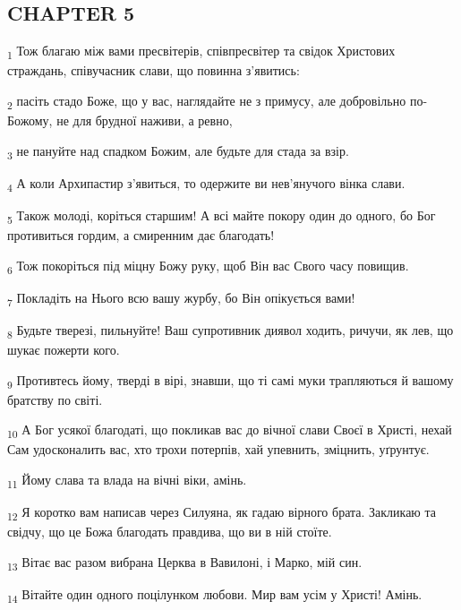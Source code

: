 \subsection{CHAPTER 5}
\begin{tcolorbox}
\textsubscript{1} Тож благаю між вами пресвітерів, співпресвітер та свідок Христових страждань, співучасник слави, що повинна з'явитись:
\end{tcolorbox}
\begin{tcolorbox}
\textsubscript{2} пасіть стадо Боже, що у вас, наглядайте не з примусу, але добровільно по-Божому, не для брудної наживи, а ревно,
\end{tcolorbox}
\begin{tcolorbox}
\textsubscript{3} не пануйте над спадком Божим, але будьте для стада за взір.
\end{tcolorbox}
\begin{tcolorbox}
\textsubscript{4} А коли Архипастир з'явиться, то одержите ви нев'янучого вінка слави.
\end{tcolorbox}
\begin{tcolorbox}
\textsubscript{5} Також молоді, коріться старшим! А всі майте покору один до одного, бо Бог противиться гордим, а смиренним дає благодать!
\end{tcolorbox}
\begin{tcolorbox}
\textsubscript{6} Тож покоріться під міцну Божу руку, щоб Він вас Свого часу повищив.
\end{tcolorbox}
\begin{tcolorbox}
\textsubscript{7} Покладіть на Нього всю вашу журбу, бо Він опікується вами!
\end{tcolorbox}
\begin{tcolorbox}
\textsubscript{8} Будьте тверезі, пильнуйте! Ваш супротивник диявол ходить, ричучи, як лев, що шукає пожерти кого.
\end{tcolorbox}
\begin{tcolorbox}
\textsubscript{9} Противтесь йому, тверді в вірі, знавши, що ті самі муки трапляються й вашому братству по світі.
\end{tcolorbox}
\begin{tcolorbox}
\textsubscript{10} А Бог усякої благодаті, що покликав вас до вічної слави Своєї в Христі, нехай Сам удосконалить вас, хто трохи потерпів, хай упевнить, зміцнить, уґрунтує.
\end{tcolorbox}
\begin{tcolorbox}
\textsubscript{11} Йому слава та влада на вічні віки, амінь.
\end{tcolorbox}
\begin{tcolorbox}
\textsubscript{12} Я коротко вам написав через Силуяна, як гадаю вірного брата. Закликаю та свідчу, що це Божа благодать правдива, що ви в ній стоїте.
\end{tcolorbox}
\begin{tcolorbox}
\textsubscript{13} Вітає вас разом вибрана Церква в Вавилоні, і Марко, мій син.
\end{tcolorbox}
\begin{tcolorbox}
\textsubscript{14} Вітайте один одного поцілунком любови. Мир вам усім у Христі! Амінь.
\end{tcolorbox}
